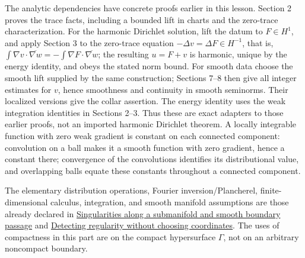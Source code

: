 \documentclass[
  11pt,
]{article}
\makeatletter
\let\ReaderOriginalAnchorStart\hyper@anchorstart
\let\ReaderOriginalAnchorEnd\hyper@anchorend
\let\ReaderPendingAliases\@empty
\def\ReaderArmAliases#1{\gdef\ReaderPendingAliases{#1}}
\def\hyper@anchorstart#1{\ReaderIfNativeAnchorTF{#1}{\ReaderPendingAliases\global\let\ReaderPendingAliases\@empty}{}\ReaderOriginalAnchorStart{#1}}
\makeatother
\begin{document}
The analytic dependencies have concrete proofs earlier in this lesson.
Section 2 proves the trace facts, including a bounded lift in charts and
the zero-trace characterization. For the harmonic Dirichlet solution,
lift the datum to \(F\in H^1\), and apply Section 3 to the zero-trace
equation \(-\Delta v=\Delta F\in H^{-1}\), that is,
\(\int\nabla v\cdot\overline{\nabla w}=-\int\nabla F\cdot\overline{\nabla w}\);
the resulting \(u=F+v\) is harmonic, unique by the energy identity, and
obeys the stated norm bound. For smooth data choose the smooth lift
supplied by the same construction; Sections 7--8 then give all integer
estimates for \(v\), hence smoothness and continuity in smooth
seminorms. Their localized versions give the collar assertion. The
energy identity uses the weak integration identities in Sections 2--3.
Thus these are exact adapters to those earlier proofs, not an imported
harmonic Dirichlet theorem. A locally integrable function with zero weak
gradient is constant on each connected component: convolution on a ball
makes it a smooth function with zero gradient, hence a constant there;
convergence of the convolutions identifies its distributional value, and
overlapping balls equate these constants throughout a connected
component.

The elementary distribution operations, Fourier inversion/Plancherel,
finite-dimensional calculus, integration, and smooth manifold
assumptions are those already declared in
\href{conormal-transmission.pdf}{Singularities along a submanifold and
smooth boundary passage} and
\href{geometric-microlocal-calculus.pdf}{Detecting regularity without
choosing coordinates}. The uses of compactness in this part are on the
compact hypersurface \(\Gamma\), not on an arbitrary noncompact
boundary.

\ReaderArmAliases{\ReaderOriginalAnchorStart{AN03-SBD-011}\ReaderOriginalAnchorEnd\begingroup\expandafter\def\csname @currentHref\endcsname{AN03-SBD-011}\label{AN03-SBD-011}\endgroup\ReaderOriginalAnchorStart{an03-sbd-011-boundary-kernels-gain-one-derivative}\ReaderOriginalAnchorEnd\begingroup\expandafter\def\csname @currentHref\endcsname{an03-sbd-011-boundary-kernels-gain-one-derivative}\label{an03-sbd-011-boundary-kernels-gain-one-derivative}\endgroup\ReaderOriginalAnchorStart{11-boundary-kernels-gain-one-derivative}\ReaderOriginalAnchorEnd\begingroup\expandafter\def\csname @currentHref\endcsname{11-boundary-kernels-gain-one-derivative}\label{11-boundary-kernels-gain-one-derivative}\endgroup\ReaderOriginalAnchorStart{boundary-kernels-gain-one-derivative}\ReaderOriginalAnchorEnd}
\end{document}
